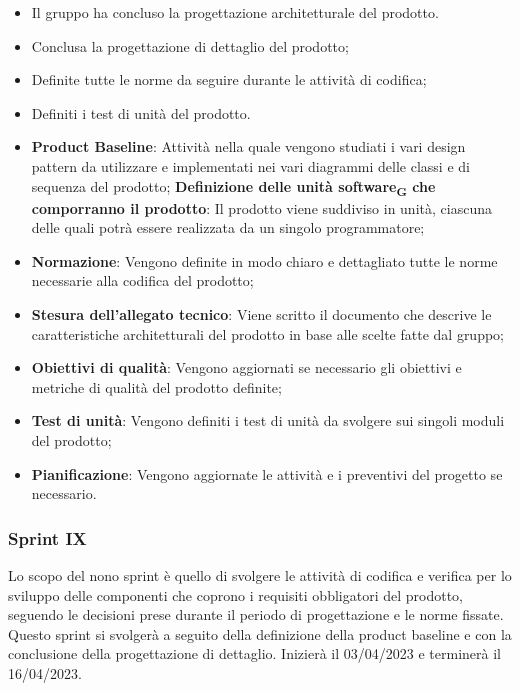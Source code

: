 \:
\begin{itemize}
	\item Il gruppo ha concluso la progettazione architetturale del prodotto.
\end{itemize}

\:
\begin{itemize}
	\item Conclusa la progettazione di dettaglio del prodotto;
	\item Definite tutte le norme da seguire durante le attività di codifica;
	\item Definiti i test di unità del prodotto.
\end{itemize}

\:
\begin{itemize}
	\item \textbf{Product Baseline}: Attività nella quale vengono studiati i vari design pattern da utilizzare e implementati nei vari diagrammi delle classi e di sequenza del prodotto;
	\subitem \textbf{Definizione delle unità software\textsubscript{G} che comporranno il prodotto}: Il prodotto viene suddiviso in unità, ciascuna delle quali potrà essere realizzata da un singolo programmatore;
	\item \textbf{Normazione}: Vengono definite in modo chiaro e dettagliato tutte le norme necessarie alla codifica del prodotto;
	\item \textbf{Stesura dell’allegato tecnico}: Viene scritto il documento che descrive le caratteristiche architetturali del prodotto in base alle scelte fatte dal gruppo;
	\item \textbf{Obiettivi di qualità}: Vengono aggiornati se necessario gli obiettivi e metriche di qualità del prodotto definite;
	\item \textbf{Test di unità}: Vengono definiti i test di unità da svolgere sui singoli moduli del prodotto;
	\item \textbf{Pianificazione}: Vengono aggiornate le attività e i preventivi del progetto se necessario.
\end{itemize}

\subsubsection{Sprint IX}
Lo scopo del nono sprint è quello di svolgere le attività di codifica e verifica per lo sviluppo delle componenti che coprono i requisiti obbligatori 
del prodotto, seguendo le decisioni prese durante il periodo di progettazione e le norme fissate.
Questo sprint si svolgerà a seguito della definizione della product baseline e con la conclusione della progettazione di dettaglio. Inizierà il 03/04/2023 e terminerà il 16/04/2023.

